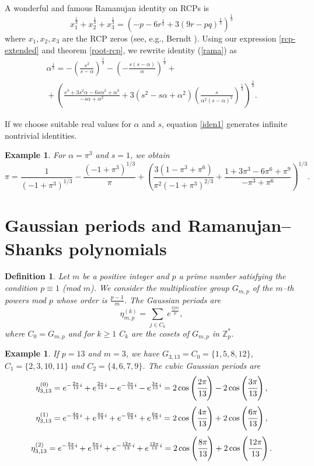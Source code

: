 \documentclass[12pt,reqno]{article}
\newtheorem{defin}[theorem]{Definition}
\newenvironment{definition}{\begin{defin}\normalfont\quad}{\end{defin}}
\newtheorem{examp}[theorem]{Example}
\newenvironment{example}{\begin{examp}\normalfont\quad}{\end{examp}}
\begin{document}
A wonderful and famous Ramanujan identity on RCPs is 
\begin{equation} \label{rama} x_1^{\frac{1}{3}}+x_2^{\frac{1}{3}}+x_3^{\frac{1}{3}}=\left(-p-6r^{\frac{1}{3}}+3(9r-pq)^{\frac{1}{3}}\right)^{\frac{1}{3}} \end{equation}
where $x_1,x_2,x_3$ are the RCP zeros (see, e.g., Berndt \cite[p.\ 22]{Br}). Using our expression \eqref{rcp-extended} and theorem \ref{root-rcp}, we rewrite identity (\ref{rama}) as
\begin{multline} \label{iden1}
\alpha^{\frac{1}{3}}=-\left(\frac{s^2}{s-\alpha}\right)^{\frac{1}{3}}-\left(-\frac{s(s-\alpha)}{\alpha}\right)^{\frac{1}{3}}{}+\\
{}+\left(\frac{s^3+3 s^2 \alpha-6 s \alpha^2+\alpha^3}{-s \alpha+\alpha^2}+3\left(s^2-s \alpha+\alpha^2\right)\left(\frac{s }{\alpha^2 (s-\alpha)^2}\right)^{\frac{1}{3}}\right)^{\frac{1}{3}}.
\end{multline}

If we choose suitable real values for $\alpha$ and $s$,  equation \eqref{iden1} generates infinite nontrivial identities.
\begin{example}
For $\alpha=\pi^3$ and $s=1$, we obtain
$$\pi = \frac{1}{\left(-1+\pi ^3\right)^{1/3}}-\frac{\left(-1+\pi ^3\right)^{1/3}}{\pi }+\left(\frac{3 \left(1-\pi ^3+\pi ^6\right)}{\pi ^2 \left(-1+\pi ^3\right)^{2/3}}+\frac{1+3 \pi ^3-6 \pi ^6+\pi ^9}{-\pi ^3+\pi ^6}\right)^{1/3}.
$$
\end{example}

\section{Gaussian periods and Ramanujan--Shanks polynomials}

\begin{definition}
Let $m$ be a positive integer and $p$ a prime number satisfying the condition $p\equiv 1$ (mod $m$). We consider the multiplicative group $G_{m,p}$ of the $m$--th powers mod $p$ whose order is $\frac{p-1}{m}$. The \emph{Gaussian periods} are
$$\eta_{m,p}^{(k)}=\sum_{j\in C_k}e^{\frac{2j\pi i}{p}},$$
where $C_0=G_{m,p}$ and for $k\geq 1$ $C_k$ are the cosets of $G_{m,p}$ in $\mathbb Z_p^*$. 
\end{definition}
\begin{example}
If $p=13$ and $m=3$, we have $G_{3,13}=C_0=\{1,5,8,12\}$, $C_1=\{2,3,10,11\}$ and $C_2=\{4,6,7,9\}$. The cubic Gaussian periods are
$$\eta_{3,13}^{(0)}=e^{-\frac{2\pi}{13}i}+e^{\frac{2\pi}{13}i}-e^{-\frac{3\pi}{13}i}-e^{\frac{3\pi}{13}i}=2\cos\left( \cfrac{2\pi}{13} \right)- 2\cos\left( \cfrac{3\pi}{13} \right),$$
$$\eta_{3,13}^{(1)}=e^{-\frac{4\pi}{13}i}+e^{\frac{4\pi}{13}i}+e^{-\frac{6\pi}{13}i}+e^{\frac{6\pi}{13}i}=2\cos\left( \cfrac{4\pi}{13} \right)+ 2\cos\left( \cfrac{6\pi}{13} \right),$$
$$\eta_{3,13}^{(2)}=e^{-\frac{8\pi}{13}i}+e^{\frac{8\pi}{13}i}+e^{-\frac{12\pi}{13}i}+e^{\frac{12\pi}{13}i}=2\cos\left( \cfrac{8\pi}{13} \right)+ 2\cos\left( \cfrac{12\pi}{13} \right).$$
\end{example}
\end{document}
